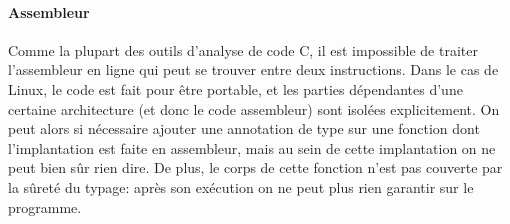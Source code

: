 









\paragraph{Assembleur}

Comme la plupart des outils d'analyse de code C, il est impossible de traiter
l'assembleur en ligne qui peut se trouver entre deux instructions. Dans le cas
de Linux, le code est fait pour être portable, et les parties dépendantes d'une
certaine architecture (et donc le code assembleur) sont isolées explicitement.
On peut alors si nécessaire ajouter une annotation de type sur une fonction dont
l'implantation est faite en assembleur, mais au sein de cette implantation on ne
peut bien sûr rien dire. De plus, le corps de cette fonction n'est pas
couverte par la sûreté du typage: après son exécution on ne peut plus rien
garantir sur le programme.

